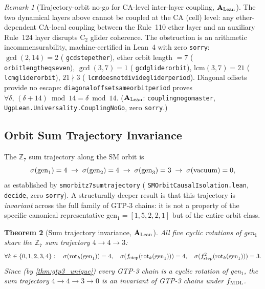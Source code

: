 \documentclass[11pt]{article}
\newtheorem{theorem}{Theorem}[section]
\theoremstyle{remark}
\newtheorem{remark}[theorem]{Remark}
\newcommand{\lean}[1]{%
  \penalty-100
  \begingroup\def\_{\textunderscore\allowbreak}\texttt{#1}\endgroup}
\newcommand{\CatAL}{\ensuremath{\textbf{A}_{\rm Lean}}}
\begin{document}
\begin{remark}[Trajectory-orbit no-go for CA-level inter-layer coupling, $\CatAL$]
\label{rem:coupling_nogo}
The two dynamical layers above cannot be coupled at the CA (cell) level: any
ether-dependent CA-local coupling between the Rule~110 ether layer and an auxiliary
Rule~124 layer disrupts C$_2$ glider coherence.
The obstruction is an arithmetic incommensurability, machine-certified in Lean~4
with zero \texttt{sorry}:
$\gcd(2,14)=2$ (\lean{gcd\_step\_ether}), ether orbit length $= 7$
(\lean{orbit\_length\_eq\_seven}), $\gcd(3,7)=1$ (\lean{gcd\_glider\_orbit}),
$\mathrm{lcm}(3,7)=21$ (\lean{lcm\_glider\_orbit}), $21 \nmid 3$
(\lean{lcm\_does\_not\_divide\_glider\_period}).
Diagonal offsets provide no escape:
\lean{diagonal\_offset\_same\_orbit\_period} proves
$\forall \delta,\, (\delta + 14) \bmod 14 = \delta \bmod 14$.
($\CatAL$: \lean{coupling\_no\_go\_master}, \lean{UgpLean.Universality.CouplingNoGo},
zero \texttt{sorry}.)
\end{remark}

\subsection{Orbit Sum Trajectory Invariance}
\label{sec:sum_trajectory}

The $\mathbb{Z}_7$ sum trajectory along the SM orbit is
\begin{equation}
\sigma({\rm gen}_1) = 4 \;\to\; \sigma({\rm gen}_2) = 4 \;\to\;
\sigma({\rm gen}_3) = 3 \;\to\; \sigma({\rm vacuum}) = 0,
\label{eq:sum_trajectory}
\end{equation}
as established by \lean{sm\_orbit\_z7\_sum\_trajectory} (\lean{SMOrbitCausalIsolation.lean},
\texttt{decide}, zero \texttt{sorry}).
A structurally deeper result is that this trajectory is \emph{invariant} across the full
family of GTP-3 chains: it is not a property of the specific canonical representative
gen$_1 = [1,5,2,2,1]$ but of the entire orbit class.

\begin{theorem}[Sum trajectory invariance, $\CatAL$]\label{thm:sum_traj}
All five cyclic rotations of gen$_1$ share the $\mathbb{Z}_7$ sum trajectory $4 \to 4 \to 3$:
\[
\forall k \in \{0,1,2,3,4\}:\quad
\sigma(\mathrm{rot}_k({\rm gen}_1)) = 4,\quad
\sigma(f_{\rm step}(\mathrm{rot}_k({\rm gen}_1))) = 4,\quad
\sigma(f_{\rm step}^2(\mathrm{rot}_k({\rm gen}_1))) = 3.
\]
Since (by \cref{thm:gtp3_unique}) every GTP-3 chain is a cyclic rotation of gen$_1$,
the sum trajectory $4 \to 4 \to 3 \to 0$ is an invariant of GTP-3 chains under $f_{\rm MDL}$.
\end{theorem}
\end{document}
